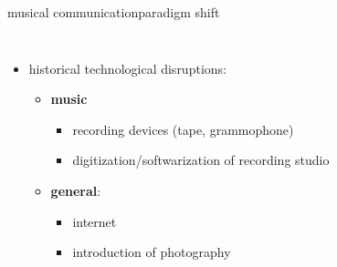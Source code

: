 \begin{frame}{musical communication}{paradigm shift}
    \vspace{-5mm}
    \begin{columns}
    
        \begin{itemize}
            \item[] historical technological disruptions:
                \begin{itemize}
                    \item \textbf{music}
                        \begin{itemize}
                            \item recording devices (tape, grammophone)
                            \item digitization/softwarization of recording studio
                        \end{itemize}
                    \bigskip
                    \item \textbf{general}:
                        \begin{itemize}
                            \item internet
                            \item introduction of photography
                        \end{itemize}
                \end{itemize}
        \end{itemize}
    

\end{columns}
\end{frame}
